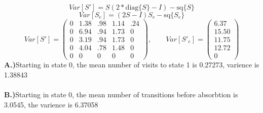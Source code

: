 \documentclass{article}
\begin{document}
 \[Var[S'] = S(2*\mbox{diag}\{S\} - I) - \mbox{sq}\{S\}\] 
 \[Var[S_e] = (2S - I)S_e - \mbox{sq}\{S_e\}\]
   \[Var[S'] = \left(\begin{array}{rrrrr}
   0 & 1.38 & .98 & 1.14 & .24 \\
   0 & 6.94 & .94 & 1.73 & 0 \\ 
   0 & 3.19 & .94 & 1.73 & 0 \\
   0 & 4.04 & .78 & 1.48 & 0 \\
   0 & 0 & 0 & 0 & 0 
 \end{array}\right), \quad \quad Var[S'_e] = \left(\begin{array}{r}
    6.37\\
   15.50\\
   11.75\\ 
   12.72\\
    0 
  \end{array}\right)\]
  \textbf{A.)}Starting in state 0, the mean number of visits to state 1 is
  0.27273, varience is 1.38843 
 \\
 \\\textbf{B.)}Starting in state 0, the mean number of transitions
  before absorbtion is 3.0545, the varience is 6.37058
  
  
\end{document}
